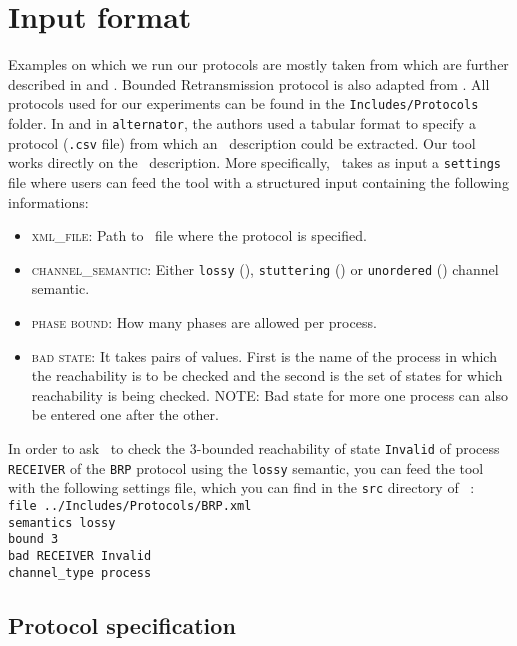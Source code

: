 \section{Input format}
\label{sec:input}

Examples on which we run our protocols are mostly taken from \cite{JRSVgit} 
which are further described in \cite{MPSV11} and \cite{RSV11}.
Bounded Retransmission protocol is also adapted from \cite{AABJ04}.
All protocols used for our experiments can be found in the \texttt{Includes/Protocols} folder.
%
In \cite{JRSVgit} and in \texttt{alternator}, the authors used a tabular format to specify a protocol (\texttt{.csv} file)
from which an \xml\ description could be extracted.
Our tool works directly on the \xml\ description.
%
More specifically, \MPass\ takes as input a \texttt{settings} file where users can feed the tool with a structured input containing the following informations:

\begin{itemize}
\item \textsc{xml\_file}: Path to \xml\ file where the protocol is specified.
\item \textsc{channel\_semantic}: Either \texttt{lossy} (\LCS), \texttt{stuttering} (\SLCS) or \texttt{unordered} (\UCS) channel semantic.
\item \textsc{phase bound}: How many phases are allowed per process.
\item \textsc{bad state}: It takes pairs of values.
%
First is the name of the process in which the reachability is to be checked and the second is the set of states for which reachability is being checked.
NOTE: Bad state for more one process can also be entered one after the other.
\end{itemize}

In order to ask \MPass\ to check the $3$-bounded reachability of state \texttt{Invalid} of process \texttt{RECEIVER} of the \texttt{BRP} protocol
using the \texttt{lossy} semantic,
you can feed the tool with the following settings file, which you can find in the \texttt{src} directory of \MPass\ :\\
\texttt{file ../Includes/Protocols/BRP.xml}\\
\texttt{semantics lossy}\\
\texttt{bound 3}\\
\texttt{bad RECEIVER Invalid}\\
\texttt{channel\_type process}

\subsection*{Protocol specification}

